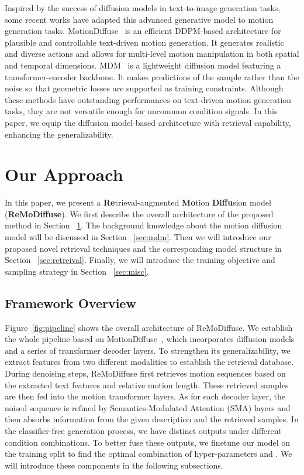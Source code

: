 \documentclass[10pt,twocolumn,letterpaper]{article}
\newcommand{\name}{ReMoDiffuse\xspace}
\begin{document}
Inspired by the success of diffusion models in text-to-image generation tasks, some recent works have adapted this advanced generative model to motion generation tasks. MotionDiffuse~\cite{zhang2022motiondiffuse} is an efficient DDPM-based architecture for plausible and controllable text-driven motion generation. It generates realistic and diverse actions and allows for multi-level motion manipulation in both spatial and temporal dimensions. MDM~\cite{tevet2022human} is a lightweight diffusion model featuring a transformer-encoder backbone. It makes predictions of the sample rather than the noise so that geometric losses are supported as training constraints. Although these methods have outstanding performances on text-driven motion generation tasks, they are not versatile enough for uncommon condition signals. In this paper, we equip the diffusion model-based architecture with retrieval capability, enhancing the generalizability.
 \section{Our Approach}
\label{sec:overview}

In this paper, we present a \textbf{Re}trieval-augmented \textbf{Mo}tion \textbf{Diffu}sion model (\textbf{\name}). We first describe the overall architecture of the proposed method in Section ~\ref{sec:overview}. The background knowledge about the motion diffusion model will be discussed in Section ~\ref{sec:mdm}. Then we will introduce our proposed novel retrieval techniques and the corresponding model structure in Section ~\ref{sec:retreival}. Finally, we will introduce the training objective and sampling strategy in Section ~\ref{sec:misc}.

\subsection{Framework Overview}


Figure~\ref{fig:pipeline} shows the overall architecture of \name. We establish the whole pipeline based on MotionDiffuse~\cite{zhang2022motiondiffuse}, which incorporates diffusion models and a series of transformer decoder layers. To strengthen its generalizability, we extract features from two different modalities to establish the retrieval database. During denoising steps, \name first retrieves motion sequences based on the extracted text features and relative motion length. These retrieved samples are then fed into the motion transformer layers. As for each decoder layer, the noised sequence is refined by Semantics-Modulated Attention (SMA) layers and then absorbs information from the given description and the retrieved samples. In the classifier-free generation process, we have distinct outputs under different condition combinations. To better fuse these outputs, we finetune our model on the training split to find the optimal combination of hyper-parameters  and . We will introduce these components in the following subsections. 
\end{document}
